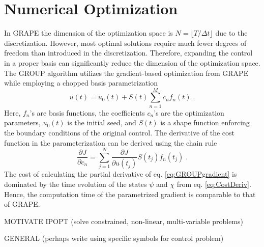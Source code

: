\section{Numerical Optimization}

In GRAPE the dimension of the optimization space is $N = \lfloor T / \Delta t \rfloor$ due to the discretization. However, most optimal solutions require much fewer degrees of freedom than introduced in the discretization. Therefore, expanding the control in a proper basis can significantly reduce the dimension of the optimization space.
The GROUP algorithm utilizes the gradient-based optimization from GRAPE while employing a chopped basis parametrization 
\begin{equation}
	u(t) = u_0 (t) + S(t) \sum_{n=1}^{M} c_n f_n (t) \; . \label{eq:controlParametrization}
\end{equation}
Here, $f_n$'s are basis functions, the coefficients $c_n$'s are the optimization parameters, $u_0 (t)$ is the initial seed, and $S(t)$ is a shape function enforcing the boundary conditions of the original control. The derivative of the cost function in the parameterization can be derived using the chain rule
\begin{equation}
	\frac{\partial J }{\partial c_n} = \sum_{j = 1}^{N} \frac{\partial J }{\partial u(t_j)} S(t_j) f_n(t_j) \; . \label{eq:GROUPgradient} 
\end{equation}
The cost of calculating the partial derivative of eq. \eqref{eq:GROUPgradient} is dominated by the time evolution of the states $\psi$ and $\chi$ from eq. \eqref{eq:CostDeriv}. Hence, the computation time of the parametrized gradient is comparable to that of GRAPE.


MOTIVATE IPOPT (solve constrained, non-linear, multi-variable problems)

GENERAL (perhaps write using specific symbols for control problem)

